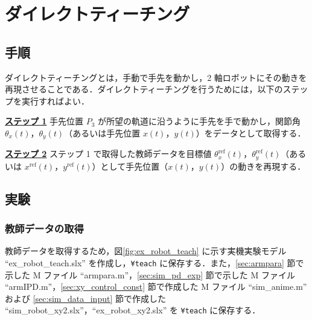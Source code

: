 \section{ダイレクトティーチング}
\label{sec:direct_teaching}

\subsection{手順}
ダイレクトティーチングとは，手動で手先を動かし，2 軸ロボットにその動きを再現させることである．ダイレクトティーチングを行うためには，以下のステップを実行すればよい．

\underline{\textbf{ステップ 1}}\quad 
手先位置 $P_3$ が所望の軌道に沿うように手先を手で動かし，関節角 $\theta_x(t)$，$\theta_y(t)$（あるいは手先位置 $x(t)$，$y(t)$）をデータとして取得する．

\underline{\textbf{ステップ 2}}\quad 
ステップ 1 で取得した教師データを目標値 $\theta_x^{\mathrm{ref}}(t)$，$\theta_y^{\mathrm{ref}}(t)$（あるいは $x^{\mathrm{ref}}(t)$，$y^{\mathrm{ref}}(t)$）として手先位置（$x(t)$，$y(t)$）の動きを再現する．

\subsection{実験}
\label{sec:teach}

\subsubsection{教師データの取得}

教師データを取得するため，図\ref{fig:ex_robot_teach} に示す実機実験モデル ``ex\_robot\_teach.slx'' を作成し，\verb|¥teach| に保存する．また，\ref{sec:armpara} 節で示した M ファイル ``armpara.m''，\ref{sec:sim_pd_exp} 節で示した M ファイル ``armIPD.m''，\ref{sec:xy_control_const} 節で作成した M ファイル ``sim\_anime.m'' および \ref{sec:sim_data_input} 節で作成した ``sim\_robot\_xy2.slx''，``ex\_robot\_xy2.slx'' を \verb|¥teach| に保存する．

